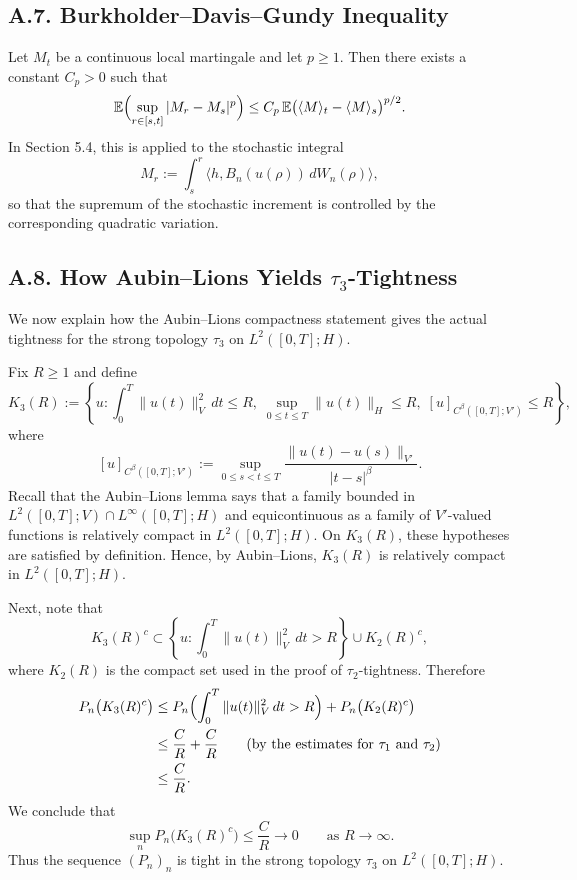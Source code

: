 \documentclass[11pt]{article}
\theoremstyle{definition}
\theoremstyle{remark}
\begin{document}
\subsection*{A.7. Burkholder--Davis--Gundy Inequality}
Let $M_t$ be a continuous local martingale and let $p\ge 1$. Then there exists a constant $C_p>0$ such that
\[
  \mathbb E\Bigl(\sup_{r\in[s,t]} |M_r-M_s|^p\Bigr)
  \le
  C_p\,\mathbb E\bigl(\langle M\rangle_t-\langle M\rangle_s\bigr)^{p/2}.
\]
In Section 5.4, this is applied to the stochastic integral
\[
  M_r:=\int_s^r \langle h,B_n(u(\rho))\,dW_n(\rho)\rangle,
\]
so that the supremum of the stochastic increment is controlled by the corresponding quadratic variation.

\subsection*{A.8. How Aubin--Lions Yields $\tau_3$-Tightness}
We now explain how the Aubin--Lions compactness statement gives the actual tightness for the strong topology $\tau_3$ on $L^2([0,T];H)$.

Fix $R\ge 1$ and define
\[
  K_3(R)
  :=
  \left\{
    u:
    \int_0^T \|u(t)\|_V^2\,dt\le R,\;
    \sup_{0\le t\le T}\|u(t)\|_H\le R,\;
    [u]_{C^\beta([0,T];V')}\le R
  \right\},
\]
where
\[
  [u]_{C^\beta([0,T];V')}
  :=
  \sup_{0\le s<t\le T}\frac{\|u(t)-u(s)\|_{V'}}{|t-s|^\beta}.
\]
Recall that the Aubin--Lions lemma says that a family bounded in $L^2([0,T];V)\cap L^\infty([0,T];H)$ and equicontinuous as a family of $V'$-valued functions is relatively compact in $L^2([0,T];H)$. On $K_3(R)$, these hypotheses are satisfied by definition. Hence, by Aubin--Lions, $K_3(R)$ is relatively compact in $L^2([0,T];H)$.

Next, note that
\[
  K_3(R)^c
  \subset
  \left\{
    u:
    \int_0^T \|u(t)\|_V^2\,dt>R
  \right\}
  \cup
  K_2(R)^c,
\]
where $K_2(R)$ is the compact set used in the proof of $\tau_2$-tightness. Therefore
\begin{align*}
  P_n\bigl(K_3(R)^c\bigr)
  &\le
  P_n\Bigl(
    \int_0^T \|u(t)\|_V^2\,dt>R
  \Bigr)
  +
  P_n\bigl(K_2(R)^c\bigr) \\
  &\le
  \frac{C}{R}
  +
  \frac{C}{R}
  \qquad \text{(by the estimates for $\tau_1$ and $\tau_2$)} \\
  &\le
  \frac{C}{R}.
\end{align*}
We conclude that
\[
  \sup_n
  P_n\bigl(K_3(R)^c\bigr)
  \le
  \frac{C}{R}\to 0
  \qquad \text{as } R\to\infty.
\]
Thus the sequence $(P_n)_n$ is tight in the strong topology $\tau_3$ on $L^2([0,T];H)$.
\end{document}
